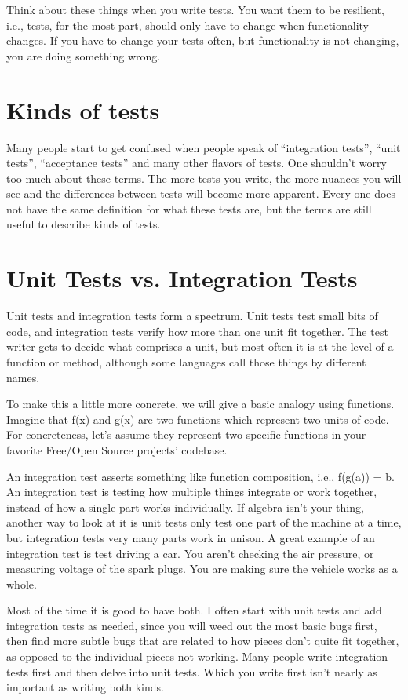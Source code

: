 Think about these things when you write tests. You want them to be resilient,
i.e., tests, for the most part, should only have to change when functionality
changes. If you have to change your tests often, but functionality is not
changing, you are doing something wrong.

\section*{Kinds of tests}

Many people start to get confused when people speak of ``integration tests'',
``unit tests'', ``acceptance tests'' and many other flavors of tests. One
shouldn't worry too much about these terms. The more tests you write, the more
nuances you will see and the differences between tests will become more
apparent. Every one does not have the same definition for what these tests are,
but the terms are still useful to describe kinds of tests.

\section*{Unit Tests vs. Integration Tests}

Unit tests and integration tests form a spectrum. Unit tests test small bits of
code, and integration tests verify how more than one unit fit together. The test
writer gets to decide what comprises a unit, but most often it is at the level
of a function or method, although some languages call those things by different
names.

To make this a little more concrete, we will give a basic analogy using
functions. Imagine that f(x) and g(x) are two functions which represent two units of code. For
concreteness, let's assume they represent two specific functions in your
favorite Free/Open Source projects' codebase.

An integration test asserts something like function composition, i.e., f(g(a)) =
b. An integration test is testing how multiple
things integrate or work together, instead of how a single part works
individually. If algebra isn't your thing, another way to look at it is unit
tests only test one part of the machine at a time, but integration tests very
many parts work in unison. A great example of an integration test is test
driving a car. You aren't checking the air pressure, or measuring voltage of the
spark plugs. You are making sure the vehicle works as a whole.

Most of the time it is good to have both. I often start with unit tests and add
integration tests as needed, since you will weed out the most basic bugs first,
then find more subtle bugs that are related to how pieces don't quite fit
together, as opposed to the individual pieces not working. Many people write
integration tests first and then delve into unit tests. Which you write first
isn't nearly as important as writing both kinds.
